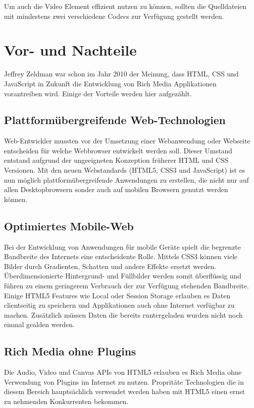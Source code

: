Um auch die Video Element effizient nutzen zu können, sollten die Quelldateien
mit mindestens zwei verschiedene Codecs zur Verfügung gestellt werden.

\section{Vor- und Nachteile}
Jeffrey Zeldman war schon im Jahr 2010 der Meinung, dass HTML, CSS und
JavaScript in Zukunft die Entwicklung von Rich Media Applikationen vorantreiben
wird. Einige der Vorteile werden hier aufgezählt.

\subsection{Plattformübergreifende Web-Technologien}
Web-Entwickler mussten vor der Umsetzung einer Webanwendung oder Webseite
entscheiden für welche Webbrowser entwickelt werden soll. Dieser Umstand
entstand aufgrund der ungeeigneten Konzeption früherer HTML und CSS Versionen.
Mit den neuen Webstandards (HTML5, CSS3 und JavaScript) ist es nun möglich
plattformübergreifende Anwendungen zu erstellen, die nicht nur auf allen
Desktopbrowsern sonder auch auf mobilen Browsern genutzt werden können.

\subsection{Optimiertes Mobile-Web}
Bei der Entwicklung von Anwendungen für mobile Geräte spielt die begrenzte
Bandbreite des Internets eine entscheidente Rolle. Mittels CSS3 können viele
Bilder durch Gradienten, Schatten und andere Effekte ersetzt werden.
Überdimensionierte Hintergrund- und Füllbilder werden somit überflüssig und
führen zu einem geringerem Verbrauch der zur Verfügung stehenden Bandbreite.
Einige HTML5 Features wie Local oder Session Storage erlauben es Daten
clientseitig zu speichern und Applikationen auch ohne Internet verfügbar zu
machen. Zusätzlich müssen Daten die bereits runtergeladen wurden nicht noch
einmal gealden werden.

\subsection{Rich Media ohne Plugins}
Die Audio, Video und Canvas APIs von HTML5 erlauben es Rich Media ohne
Verwendung von Plugins im Internet zu nutzen. Propritäte Technologien die in
diesem Bereich hauptsächlich verwendet werden haben mit HTML5 einen ernst zu
nehmenden Konkurrenten bekommen.

